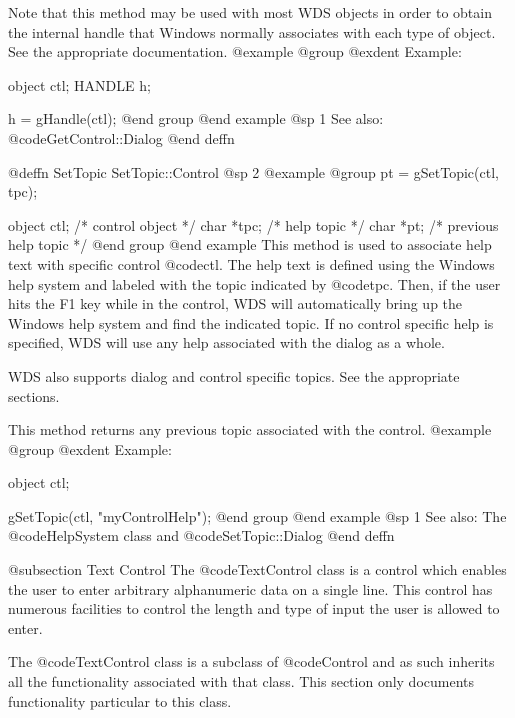 Note that this method may be used with most WDS objects in order to obtain
the internal handle that Windows normally associates with each type of object.
See the appropriate documentation.
@example
@group
@exdent Example:

object  ctl;
HANDLE  h;

h = gHandle(ctl);
@end group
@end example
@sp 1
See also:  @code{GetControl::Dialog}
@end deffn











@deffn {SetTopic} SetTopic::Control
@sp 2
@example
@group
pt = gSetTopic(ctl, tpc);

object  ctl;    /*  control object        */
char    *tpc;   /*  help topic            */
char    *pt;    /*  previous help topic   */
@end group
@end example
This method is used to associate help text with specific control @code{ctl}.
The help text is defined using the Windows help system and labeled
with the topic indicated by @code{tpc}.  Then, if the user hits
the F1 key while in the control, WDS will automatically bring up
the Windows help system and find the indicated topic.  If no control
specific help is specified, WDS will use any help associated with the
dialog as a whole.

WDS also supports dialog and control specific topics.  See the appropriate
sections.

This method returns any previous topic associated with the control.
@example
@group
@exdent Example:

object  ctl;

gSetTopic(ctl, "myControlHelp");
@end group
@end example
@sp 1
See also:  The @code{HelpSystem} class and @code{SetTopic::Dialog}
@end deffn











@subsection Text Control
The @code{TextControl} class is a control which enables the user to
enter arbitrary alphanumeric data on a single line.  This control
has numerous facilities to control the length and type of input the
user is allowed to enter.

The @code{TextControl} class is a subclass of @code{Control} and as such
inherits all the functionality associated with that class.  This section
only documents functionality particular to this class.

